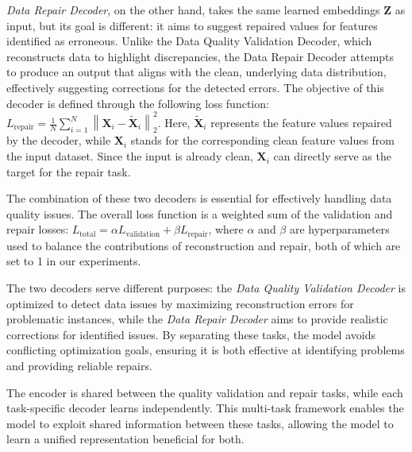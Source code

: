 {\textit{Data Repair Decoder}, on the other hand, takes the same learned embeddings \(\mathbf{Z}\) as input, but its goal is different: it aims to suggest repaired values for features identified as erroneous. 
Unlike the Data Quality Validation Decoder, which reconstructs data to highlight discrepancies, the Data Repair Decoder attempts to produce an output that aligns with the clean, underlying data distribution, effectively suggesting corrections for the detected errors. 
The objective of this decoder is defined through the following loss function:
\(
L_{\text{repair}} = \frac{1}{N} \sum_{i=1}^{N} \left\| {\mathbf{X}}_i - \tilde{\mathbf{X}}_i \right\|_2^2
\).
Here, \(\tilde{\mathbf{X}}_i\) represents the feature values repaired by the decoder, while \(\mathbf{X}_i\) stands for the corresponding clean feature values from the input dataset. Since the input is already clean, \(\mathbf{X}_i\) can directly serve as the target for the repair task.

The combination of these two decoders is essential for effectively handling data quality issues. 
The overall loss function is a weighted sum of the validation and repair losses:
\(
L_{\text{total}} = \alpha L_{\text{validation}} + \beta L_{\text{repair}}
\),
where \(\alpha\) and \(\beta\) are hyperparameters used to balance the contributions of reconstruction and repair, both of which are set to 1 in our experiments.

The two decoders serve different purposes: the \textit{Data Quality Validation Decoder} is optimized to detect data issues by maximizing reconstruction errors for problematic instances, while the \textit{Data Repair Decoder} aims to provide realistic corrections for identified issues. By separating these tasks, the model avoids conflicting optimization goals, ensuring it is both effective at identifying problems and providing reliable repairs.


The encoder is shared between the quality validation and repair tasks, while each task-specific decoder learns independently. This multi-task framework enables the model to exploit shared information between these tasks, allowing the model to learn a unified representation beneficial for both.

}
